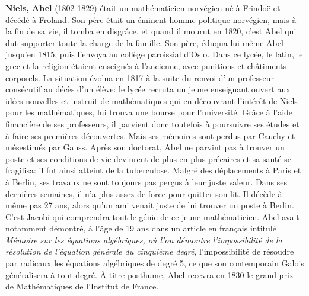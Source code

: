 \textbf{Niels, Abel} (1802-1829) était un mathématicien norvégien né à Frindoë et décédé à Froland. Son père était un éminent homme politique norvégien, mais à la fin de sa vie, il tomba en disgrâce, et quand il mourut en 1820, c'est Abel qui dut supporter toute la charge de la famille. Son père, éduqua lui-même Abel jusqu'en 1815, puis l'envoya au collège paroissial d'Oslo. Dans ce lycée, le latin, le grec et la religion étaient enseignés à l'ancienne, avec punitions et châtiments corporels. La situation évolua en 1817 à la suite du renvoi d'un professeur consécutif au décès d'un élève: le lycée recruta un jeune enseignant ouvert aux idées nouvelles et instruit de mathématiques qui en découvrant l'intérêt de Niels pour les mathématiques, lui trouva une bourse pour l'université. Grâce à l'aide financière de ses professeurs, il parvient donc toutefois à poursuivre ses études et à faire ses premières découvertes. Mais ses mémoires sont perdus par Cauchy et mésestimés par Gauss. Après son doctorat, Abel ne parvint pas à trouver un poste et ses conditions de vie devinrent de plus en plus précaires et sa santé se fragilisa: il fut ainsi atteint de la tuberculose. Malgré des déplacements à Paris et à Berlin, ses travaux ne sont toujours pas perçus à leur juste valeur. Dans ses dernières semaines, il n'a plus assez de force pour quitter son lit. Il décède à même pas 27 ans, alors qu'un ami venait juste de lui trouver un poste à Berlin.  C'est Jacobi qui comprendra tout le génie de ce jeune mathématicien. Abel avait notamment démontré, à l'âge de 19 ans dans un article en français intitulé \textit{Mémoire sur les équations algébriques, où l'on démontre l'impossibilité de la résolution de l'équation générale du cinquième degré}, l'impossibilité de résoudre par radicaux les équations algébriques de degré 5, ce que son contemporain Galois généralisera à tout degré. À titre posthume, Abel recevra en 1830 le grand prix de Mathématiques de l'Institut de France.

